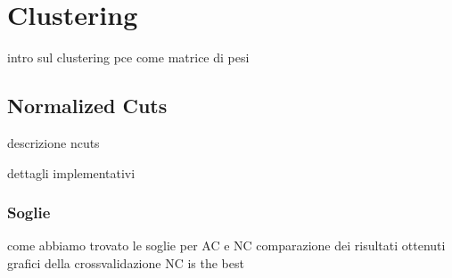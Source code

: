 \section{Clustering}

intro sul clustering
pce come matrice di pesi


\subsection{Normalized Cuts}

descrizione ncuts

dettagli implementativi

\subsubsection{Soglie}

come abbiamo trovato le soglie per AC e NC
comparazione dei risultati ottenuti
grafici della crossvalidazione
NC is the best